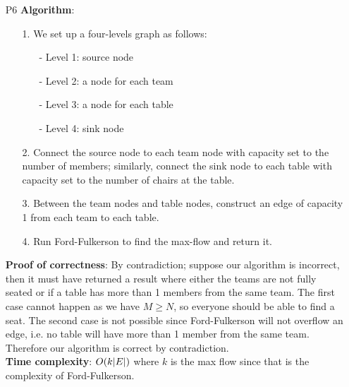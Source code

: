 \documentclass{article}
\begin{document}
\newpage
\begin{itemize}
    \item [P6]
          \textbf{Algorithm}:
          \begin{itemize}
              \item [1.] We set up a four-levels graph as follows:
                    \begin{itemize}
                        \item [-] Level 1: source node
                        \item [-] Level 2: a node for each team
                        \item [-] Level 3: a node for each table
                        \item [-] Level 4: sink node
                    \end{itemize}
              \item [2.] Connect the source node to each team node with capacity set to the number of members; similarly, connect the sink node to each table with capacity set to the number of chairs at the table.
              \item [3.] Between the team nodes and table nodes, construct an edge of capacity 1 from each team to each table.
              \item [4.] Run Ford-Fulkerson to find the max-flow and return it.
          \end{itemize}
          \textbf{Proof of correctness}: By contradiction; suppose our algorithm is incorrect, then it must have returned a result where either the teams are not fully seated or if a table has more than 1 members from the same team. The first case cannot happen as we have $M\geq N$, so everyone should be able to find a seat. The second case is not possible since Ford-Fulkerson will not overflow an edge, i.e. no table will have more than 1 member from the same team. Therefore our algorithm is correct by contradiction.\\
          \textbf{Time complexity}: $O(k\abs{E})$ where $k$ is the max flow since that is the complexity of Ford-Fulkerson.
\end{itemize}
\end{document}
